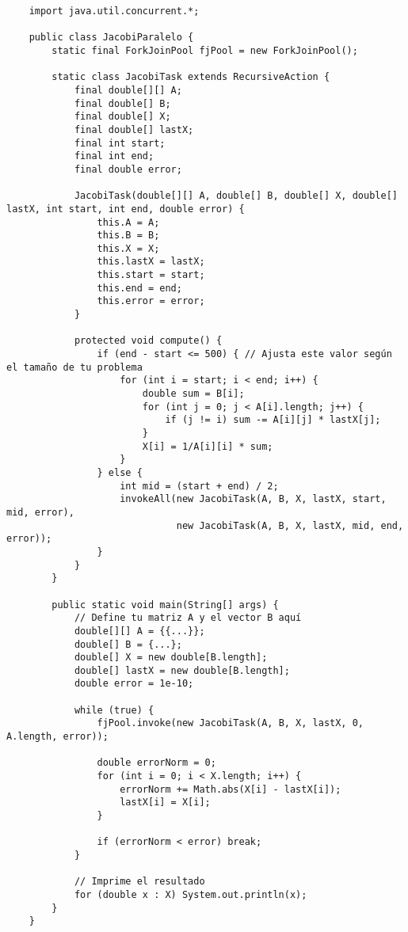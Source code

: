 \documentclass[]{article}
\begin{document}
\begin{verbatim}
    import java.util.concurrent.*;
    
    public class JacobiParalelo {
        static final ForkJoinPool fjPool = new ForkJoinPool();
    
        static class JacobiTask extends RecursiveAction {
            final double[][] A;
            final double[] B;
            final double[] X;
            final double[] lastX;
            final int start;
            final int end;
            final double error;
    
            JacobiTask(double[][] A, double[] B, double[] X, double[] lastX, int start, int end, double error) {
                this.A = A;
                this.B = B;
                this.X = X;
                this.lastX = lastX;
                this.start = start;
                this.end = end;
                this.error = error;
            }
    
            protected void compute() {
                if (end - start <= 500) { // Ajusta este valor según el tamaño de tu problema
                    for (int i = start; i < end; i++) {
                        double sum = B[i];
                        for (int j = 0; j < A[i].length; j++) {
                            if (j != i) sum -= A[i][j] * lastX[j];
                        }
                        X[i] = 1/A[i][i] * sum;
                    }
                } else {
                    int mid = (start + end) / 2;
                    invokeAll(new JacobiTask(A, B, X, lastX, start, mid, error),
                              new JacobiTask(A, B, X, lastX, mid, end, error));
                }
            }
        }
    
        public static void main(String[] args) {
            // Define tu matriz A y el vector B aquí
            double[][] A = {{...}};
            double[] B = {...};
            double[] X = new double[B.length];
            double[] lastX = new double[B.length];
            double error = 1e-10;
    
            while (true) {
                fjPool.invoke(new JacobiTask(A, B, X, lastX, 0, A.length, error));
    
                double errorNorm = 0;
                for (int i = 0; i < X.length; i++) {
                    errorNorm += Math.abs(X[i] - lastX[i]);
                    lastX[i] = X[i];
                }
    
                if (errorNorm < error) break;
            }
    
            // Imprime el resultado
            for (double x : X) System.out.println(x);
        }
    }
    \end{verbatim}
    
\end{document}
